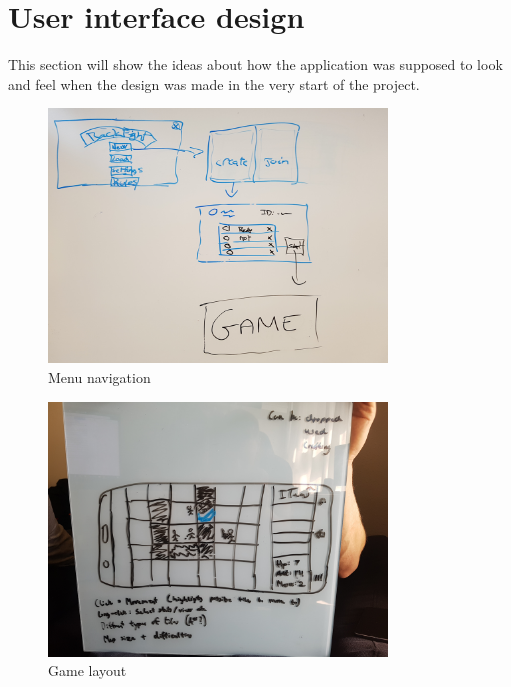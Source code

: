 \section{User interface design}
This section will show the ideas about how the application was supposed to look and feel when the design was made in the very start of the project.

\begin{figure}[ht!]
	\centering
	\includegraphics[width=90mm]{images/Gui.png}
	\caption{Menu navigation \label{navigation}}
\end{figure}

\begin{figure}[ht!]
	\centering
	\includegraphics[width=90mm]{images/GameView.png}
	\caption{Game layout \label{layout}}
\end{figure}

